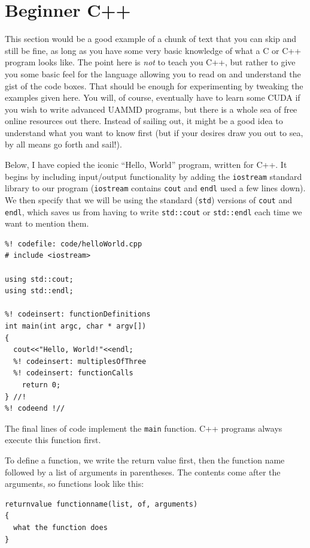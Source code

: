 \section*{Beginner C++}

This section would be a good example of a chunk of text that you can skip and 
still be fine, as long as you have some very basic knowledge of what a C or C++ 
program looks like. The point here is \textit{not} to teach you C++, but rather 
to give you some basic feel for the language allowing you to read on and 
understand the gist of the code boxes. That should be enough for experimenting 
by tweaking the examples given here. You will, of course, eventually have to 
learn some CUDA if you wish to write advanced UAMMD programs, but there is a 
whole sea of free online resources out there. Instead of sailing out, it might 
be a good idea to understand what you want to know first (but if your desires 
draw you out to sea, by all means go forth and sail!).

Below, I have copied the iconic ``Hello, World'' program, written for C++. It
begins by including input/output functionality by adding the \texttt{iostream}
standard library to our program (\texttt{iostream} contains \texttt{cout} and
\texttt{endl} used a few lines down). We then specify that we will be using
the standard (\texttt{std}) versions of \texttt{cout} and \texttt{endl}, which
saves us from having to write \texttt{std::cout} or \texttt{std::endl} each
time we want to mention them.
\begin{lstlisting}
%! codefile: code/helloWorld.cpp
# include <iostream>

using std::cout;
using std::endl;

%! codeinsert: functionDefinitions
int main(int argc, char * argv[])
{
  cout<<"Hello, World!"<<endl;
  %! codeinsert: multiplesOfThree
  %! codeinsert: functionCalls
	return 0;
} //!
%! codeend !//
\end{lstlisting}

The final lines of code implement the \texttt{main} function. C++ programs
always execute this function first.

To define a function, we write the return value first, then the function name
followed by a list of arguments in parentheses. The contents come after the
arguments, so functions look like this:
\begin{lstlisting}
returnvalue functionname(list, of, arguments)
{
  what the function does
}
\end{lstlisting}

